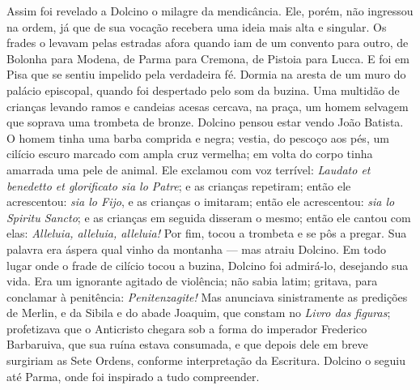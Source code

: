 Assim foi revelado a Dolcino o milagre da mendicância. Ele, porém, não
ingressou na ordem, já que de sua vocação recebera uma ideia mais alta e
singular. Os frades o levavam pelas estradas afora quando iam de um
convento para outro, de Bolonha para Modena, de Parma para Cremona, de
Pistoia para Lucca. E foi em Pisa que se sentiu impelido pela verdadeira
fé. Dormia na aresta de um muro do palácio episcopal, quando foi
despertado pelo som da buzina. Uma multidão de crianças levando ramos e
candeias acesas cercava, na praça, um homem selvagem que soprava uma
trombeta de bronze. Dolcino pensou estar vendo João Batista. O homem tinha
uma barba comprida e negra; vestia, do pescoço aos pés, um cilício escuro
marcado com ampla cruz vermelha; em volta do corpo tinha amarrada uma pele
de animal. Ele exclamou com voz terrível: \textit{Laudato et benedetto et
glorificato sia lo Patre}; e as crianças repetiram; então ele acrescentou:
\textit{sia lo Fijo}, e as crianças o imitaram; então ele acrescentou:
\textit{sia lo Spiritu Sancto}; e as crianças em seguida disseram o mesmo;
então ele cantou com elas: \textit{Alleluia, alleluia, alleluia!} Por fim,
tocou a trombeta e se pôs a pregar. Sua palavra era áspera qual vinho da
montanha --- mas atraiu Dolcino. Em todo lugar onde o frade de cilício tocou
a buzina, Dolcino foi admirá-lo, desejando sua vida. Era um ignorante
agitado de violência; não sabia latim; gritava, para conclamar à
penitência: \textit{Penitenzagite!} Mas anunciava sinistramente as
predições de Merlin, e da Sibila e do abade Joaquim, que constam no
\textit{Livro das figuras}; profetizava que o Anticristo chegara sob a
forma do imperador Frederico Barbaruiva, que sua ruína estava consumada, e
que depois dele em breve surgiriam as Sete Ordens, conforme interpretação
da Escritura. Dolcino o seguiu até Parma, onde foi inspirado a tudo
compreender.

